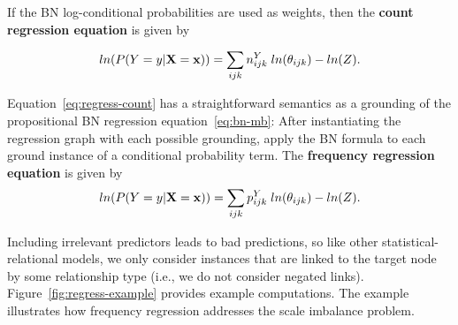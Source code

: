 \documentclass{article}
\begin{document}
If the BN log-conditional probabilities are used as weights, then the
\textbf{count regression equation} is given by 

\begin{equation} \label{eq:regress-count}
ln(P(Y = y|\mathbf{X}=\mathbf{x})) = \sum_{ijk} n^{Y}_{ijk} \; ln(\theta_{ijk}) - ln(Z).
\end{equation}

Equation~\eqref{eq:regress-count} has a straightforward semantics as a grounding of the propositional BN regression equation~\eqref{eq:bn-mb}: After instantiating the regression graph with each possible grounding, apply the BN formula to each ground instance of a conditional probability term.
%
The
\textbf{frequency regression equation} is given by 
\begin{equation} \label{eq:regress-frequency}
ln(P(Y = y|\mathbf{X}=\mathbf{x})) = \sum_{ijk} p^{Y}_{ijk} \; ln(\theta_{ijk}) - ln(Z).
\end{equation}

Including irrelevant predictors leads to bad predictions, so like other statistical-relational models, we only consider instances that are linked to the target node by some relationship type (i.e., we do not consider negated links). 
Figure~\ref{fig:regress-example} provides example computations.
 The example illustrates how frequency regression addresses the scale imbalance problem. 

\end{document}
